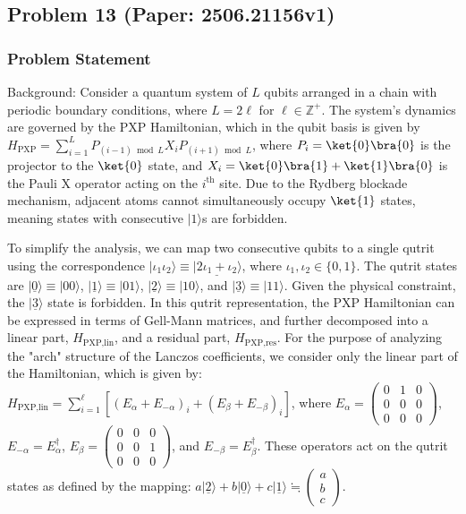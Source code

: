 \documentclass[10pt]{article}
\begin{document}
\subsection*{Problem 13 (Paper: 2506.21156v1)}
\subsubsection*{Problem Statement}
Background:
Consider a quantum system of $L$ qubits arranged in a chain with periodic boundary conditions, where $L=2\ell$ for $\ell \in \mathbb{Z}^+$. The system's dynamics are governed by the PXP Hamiltonian, which in the qubit basis is given by $H_{\text{PXP}} = \sum_{i=1}^L P_{(i-1) \bmod L}X_{i}P_{(i+1) \bmod L}$, where $P_i = \ket{0}\bra{0}$ is the projector to the $\ket{0}$ state, and $X_i=\ket{0}\bra{1}+\ket{1}\bra{0}$ is the Pauli X operator acting on the $i^{\text{th}}$ site. Due to the Rydberg blockade mechanism, adjacent atoms cannot simultaneously occupy $\ket{1}$ states, meaning states with consecutive $|1\rangle$s are forbidden.

To simplify the analysis, we can map two consecutive qubits to a single qutrit using the correspondence $|\iota_1 \iota_2\rangle \equiv |\underline{2\iota_1 + \iota_2}\rangle$, where $\iota_1, \iota_2 \in \{0,1\}$. The qutrit states are $|\underline{0}\rangle \equiv |00\rangle$, $|\underline{1}\rangle \equiv |01\rangle$, $|\underline{2}\rangle \equiv |10\rangle$, and $|\underline{3}\rangle \equiv |11\rangle$. Given the physical constraint, the $|\underline{3}\rangle$ state is forbidden. In this qutrit representation, the PXP Hamiltonian can be expressed in terms of Gell-Mann matrices, and further decomposed into a linear part, $H_{\text{PXP,lin}}$, and a residual part, $H_{\text{PXP,res}}$. For the purpose of analyzing the "arch" structure of the Lanczos coefficients, we consider only the linear part of the Hamiltonian, which is given by:
$H_{\text{PXP,lin}} = \sum_{i=1}^{\ell} \left[ \left( E_{\alpha}+ E_{-\alpha} \right)_{i} + \left( E_{\beta}+ E_{-\beta} \right)_{i} \right]$, where $E_{\alpha} = \begin{pmatrix} 0 & 1 & 0 \\ 0 & 0 & 0 \\ 0 & 0 & 0 \end{pmatrix}$, $E_{-\alpha} = E_{\alpha}^{\dagger}$, $E_{\beta} = \begin{pmatrix} 0 & 0 & 0 \\ 0 & 0 & 1 \\ 0 & 0 & 0 \end{pmatrix}$, and $E_{-\beta} = E_{\beta}^{\dagger}$. These operators act on the qutrit states as defined by the mapping: $a |\underline{2}\rangle+ b|\underline{0}\rangle +c |\underline{1}\rangle \fallingdotseq \begin{pmatrix} a \\ b \\ c \end{pmatrix}$.
\end{document}
